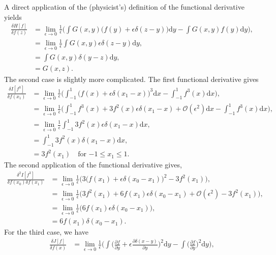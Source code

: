 \documentclass[../qft-for-the-gifted-amateur.tex]{subfiles}
\begin{document}
\begin{questions}
	\begin{solution}
		A direct application of the (physicist's) definition of the functional derivative yields
		\begin{align*}
			\frac{\delta{H}[f]}{\delta{f(z)}} &= \lim_{\epsilon\to{0}}\frac{1}{\epsilon}\Big(\int G(x, y)\big(f(y) + \epsilon\delta(z - y)\big)\mathrm{d}y - \int G(x, y)f(y)\mathrm{d}y\Big), \\
			&= \lim_{\epsilon\to{0}}\frac{1}{\epsilon}\int G(x, y)\epsilon\delta(z - y)\mathrm{d}y, \\
			&= \int G(x, y)\delta(y - z) \mathrm{d}y, \\
			&= G(x, z).
		\end{align*}
		The second case is slightly more complicated. The first functional derivative gives
		\begin{align*}
			\frac{\delta{I}[f^3]}{\delta{f(x_1)}} &= \lim_{\epsilon\to0}\frac{1}{\epsilon}\Big(\int_{-1}^1\big(f(x)+\epsilon\delta(x_1-x)\big)^3\mathrm{d}x - \int_{-1}^1 f^3(x)\mathrm{d}x \Big), \\
			&= \lim_{\epsilon\to0}\frac{1}{\epsilon}\Big(\int_{-1}^1 f^3(x) + 3f^2(x)\epsilon\delta(x_1-x) + \mathcal{O}(\epsilon^2)\mathrm{d}x - \int_{-1}^1 f^3(x)\mathrm{d}x\Big), \\
			&= \lim_{\epsilon\to0}\frac{1}{\epsilon}\int_{-1}^1 3f^2(x)\epsilon\delta(x_1-x)\mathrm{d}x, \\
			&= \int_{-1}^1 3f^2(x)\delta(x_1-x)\mathrm{d}x, \\
			&= 3f^2(x_1)\quad\text{for }{-1}\leq{x_1}\leq{1}.
		\end{align*}
		The second application of the functional derivative gives,
		\begin{align*}
			\frac{\delta^2{I}[f^3]}{\delta{f(x_0)}\delta{f(x_1)}} &= \lim_{\epsilon\to0}\frac{1}{\epsilon}\Big(3\big(f(x_1) + \epsilon\delta(x_0 - x_1)\big)^2 - 3f^2(x_1)\Big), \\
			&= \lim_{\epsilon\to0}\frac{1}{\epsilon}\Big(3f^2(x_1) + 6f(x_1)\epsilon\delta(x_0-x_1) + \mathcal{O}(\epsilon^2) - 3f^2(x_1)\Big), \\
			&= \lim_{\epsilon\to0}\frac{1}{\epsilon}\big(6f(x_1)\epsilon\delta(x_0-x_1)\big), \\
			&= 6f(x_1)\delta(x_0-x_1).
		\end{align*}
		For the third case, we have
		\begin{align*}
			\frac{\delta{J}[f]}{\delta{f(x)}} &= \lim_{\epsilon\to0}\frac{1}{\epsilon}\Big(\int\Big(\frac{\partial{f}}{\partial{y}} + \epsilon\frac{\partial\delta(x-y)}{\partial{y}}\Big)^2\mathrm{d}y - \int\Big(\frac{\partial{f}}{\partial{y}}\Big)^2\mathrm{d}y\Big), \\

\end{align*}
\end{solution}
\end{questions}
\end{document}
